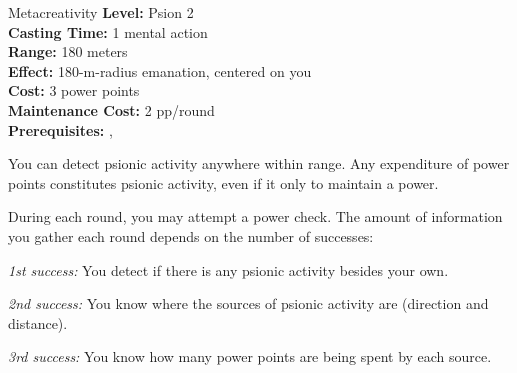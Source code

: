 {Metacreativity}
{
	\textbf{Level:}
	Psion 2\\
	\textbf{Casting Time:}
	1 mental action\\
	\textbf{Range:}
	180 meters\\
	\textbf{Effect:}
	180-m-radius emanation, centered on you\\
	\textbf{Cost:}
	3 power points\\
	\textbf{Maintenance Cost:}
	2 pp/round\\
	\textbf{Prerequisites:}
	, \\
}
{
	You can detect psionic activity anywhere within range. Any expenditure of power points constitutes psionic activity, even if it only to maintain a power.

	During each round, you may attempt a power check. The amount of information you gather each round depends on the number of successes:

	\textit{1st success:} You detect if there is any psionic activity besides your own.

	\textit{2nd success:} You know where the sources of psionic activity are (direction and distance).

	\textit{3rd success:} You know how many power points are being spent by each source.
}